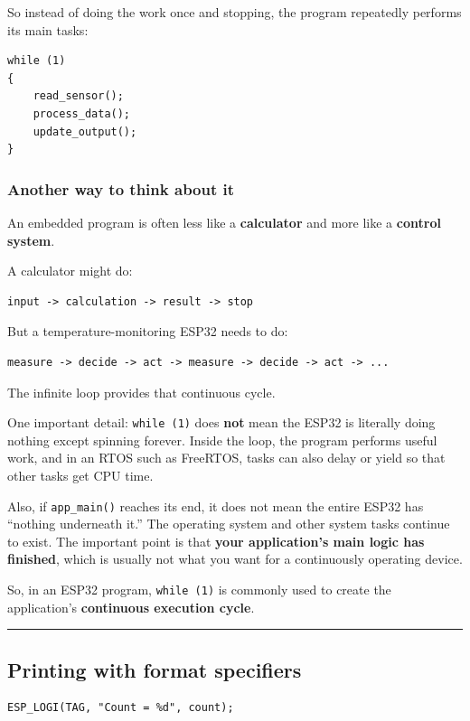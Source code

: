 \documentclass[11pt]{article}
\begin{document}
So instead of doing the work once and stopping, the program repeatedly performs its main tasks:

\begin{verbatim}
while (1)
{
    read_sensor();
    process_data();
    update_output();
}
\end{verbatim}

\subsubsection*{Another way to think about it}

An embedded program is often less like a \textbf{calculator} and more like a \textbf{control system}.

A calculator might do:

\begin{verbatim}
input -> calculation -> result -> stop
\end{verbatim}

But a temperature-monitoring ESP32 needs to do:

\begin{verbatim}
measure -> decide -> act -> measure -> decide -> act -> ...
\end{verbatim}

The infinite loop provides that continuous cycle.

One important detail: \texttt{while (1)} does \textbf{not} mean the ESP32 is literally doing nothing except spinning forever. Inside the loop, the program performs useful work, and in an RTOS such as FreeRTOS, tasks can also delay or yield so that other tasks get CPU time.

Also, if \texttt{app\_main()} reaches its end, it does not mean the entire ESP32 has ``nothing underneath it.'' The operating system and other system tasks continue to exist. The important point is that \textbf{your application's main logic has finished}, which is usually not what you want for a continuously operating device.

So, in an ESP32 program, \texttt{while (1)} is commonly used to create the application's \textbf{continuous execution cycle}.

\bigskip
\noindent\rule{\textwidth}{0.4pt}
\bigskip

\subsection*{Printing with format specifiers}

\begin{verbatim}
ESP_LOGI(TAG, "Count = %d", count);
\end{verbatim}
\end{document}

